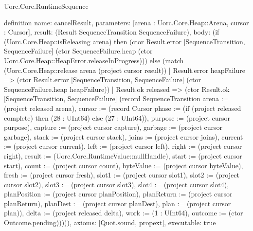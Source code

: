 \begin{lexlean}{Uorc.Core.RuntimeSequence}
\begin{semanticmodule}
definition{
  name: cancelResult,
  parameters: [arena : Uorc.Core.Heap::Arena, cursor : Cursor],
  result: (Result SequenceTransition SequenceFailure),
  body: (if (Uorc.Core.Heap::isReleasing arena) then (ctor Result.error [SequenceTransition, SequenceFailure] (ctor SequenceFailure.heap (ctor Uorc.Core.Heap::HeapError.releaseInProgress))) else (match (Uorc.Core.Heap::release arena (project cursor result))
    | Result.error heapFailure => (ctor Result.error [SequenceTransition, SequenceFailure] (ctor SequenceFailure.heap heapFailure))
    | Result.ok released => (ctor Result.ok [SequenceTransition, SequenceFailure] (record SequenceTransition {arena := (project released arena), cursor := (record Cursor {phase := (if (project released complete) then (28 : UInt64) else (27 : UInt64)), purpose := (project cursor purpose), capture := (project cursor capture), garbage := (project cursor garbage), stack := (project cursor stack), joins := (project cursor joins), current := (project cursor current), left := (project cursor left), right := (project cursor right), result := (Uorc.Core.RuntimeValue::nullHandle), start := (project cursor start), count := (project cursor count), byteValue := (project cursor byteValue), fresh := (project cursor fresh), slot1 := (project cursor slot1), slot2 := (project cursor slot2), slot3 := (project cursor slot3), slot4 := (project cursor slot4), planPosition := (project cursor planPosition), planReturn := (project cursor planReturn), planDest := (project cursor planDest), plan := (project cursor plan)}), delta := (project released delta), work := (1 : UInt64), outcome := (ctor Outcome.pending)})))),
  axioms: [Quot.sound, propext],
  executable: true
}


\end{semanticmodule}
\end{lexlean}
